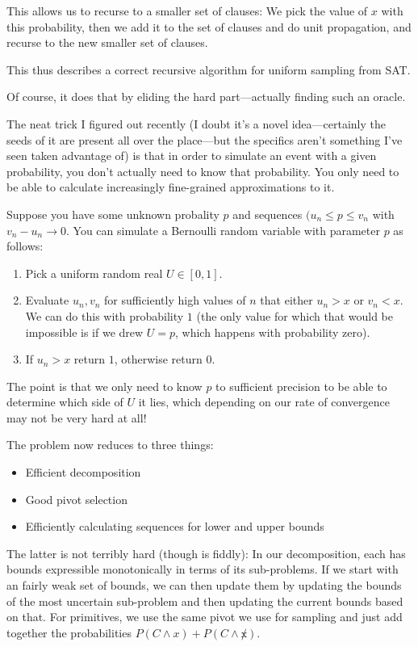 This allows us to recurse to a smaller set of clauses:
We pick the value of \(x\) with this probability,
then we add it to the set of clauses and do unit propagation,
and recurse to the new smaller set of clauses.

This thus describes a correct recursive algorithm for uniform sampling from SAT.

Of course,
it does that by eliding the hard part---actually
finding such an oracle.

The neat trick I figured out recently (I doubt it's a novel idea---certainly the seeds of it are present all over the place---but
the specifics aren't something I've seen taken advantage of) is that in order to simulate an event with a given probability,
you don't actually need to know that probability.
You only need to be able to calculate increasingly fine-grained approximations to it.

Suppose you have some unknown probality \(p\) and sequences \((u_n \leq p \leq v_n\) with \(v_n - u_n \to 0\).
You can simulate a Bernoulli random variable with parameter \(p\) as follows:

\begin{enumerate}
\item Pick a uniform random real \(U \in [0, 1]\).
\item Evaluate \(u_n, v_n\) for sufficiently high values of \(n\) that either \(u_n > x\) or \(v_n < x\).
We can do this with probability \(1\) (the only value for which that would be impossible is if we drew \(U = p\), which happens with probability zero).
\item If \(u_n > x\) return \(1\), otherwise return \(0\).
\end{enumerate}

The point is that we only need to know \(p\) to sufficient precision to be able to determine which side of \(U\) it lies,
which depending on our rate of convergence may not be very hard at all!

The problem now reduces to three things:

\begin{itemize}
\item Efficient decomposition
\item Good pivot selection
\item Efficiently calculating sequences for lower and upper bounds
\end{itemize}

The latter is not terribly hard (though is fiddly):
In our decomposition,
each has bounds expressible monotonically in terms of its sub-problems.
If we start with an fairly weak set of bounds,
we can then update them by updating the bounds of the most uncertain sub-problem and then updating the current bounds based on that.
For primitives,
we use the same pivot we use for sampling and just add together the probabilities \(P(C \wedge x) + P(C \wedge \not x)\).

